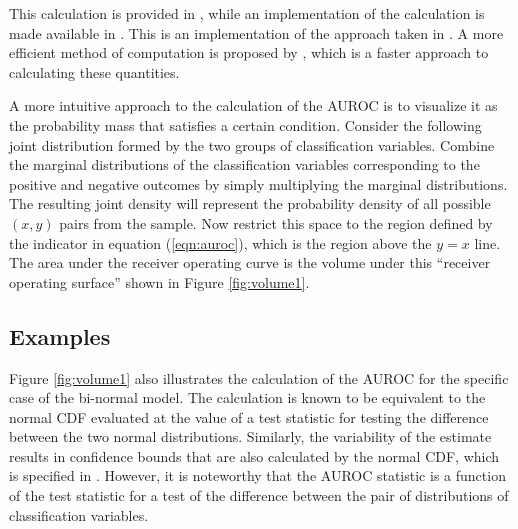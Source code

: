 This calculation is provided in \citet{hanleymcneil1982}, while an implementation of the calculation is made available in \citet{proc2011}.
This is an implementation of the approach taken in \citet{delong1988}.
%
A more efficient method of computation is proposed by \citet{sunxu2014}, which is a faster approach to calculating
these quantities.
%








A more intuitive approach to the calculation of the AUROC is to visualize it as the probability mass that satisfies a certain condition.
Consider the following joint distribution formed by the two groups of classification variables.
Combine the marginal distributions of the classification variables corresponding to the positive and negative outcomes by simply multiplying the marginal distributions.
The resulting joint density will represent the probability density of all possible $(x,y)$ pairs from the sample.
Now restrict this space to the region defined by the indicator in equation (\ref{eqn:auroc}), which is the region above the $y = x$ line.
The area under the receiver operating curve is the volume under this ``receiver operating surface'' shown in Figure \ref{fig:volume1}.


% 




\subsection{Examples}


Figure \ref{fig:volume1} also illustrates the calculation of the AUROC for the specific case of the bi-normal model.
The calculation is known to be equivalent to the normal CDF evaluated at the value of a test statistic for testing the difference between the two normal distributions.
Similarly, the variability of the estimate results in confidence bounds that are also calculated by the normal CDF, which is specified in \citet{demidenko2012}.
However, it is noteworthy that the AUROC statistic is a function of the test statistic for a test of the difference between the pair of distributions of classification variables.
%

